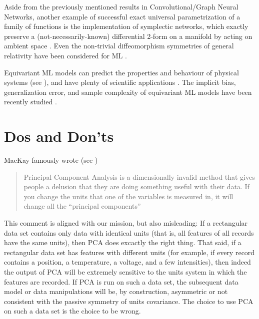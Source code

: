 \documentclass{article}
\theoremstyle{plain}
\theoremstyle{definition}
\theoremstyle{remark}
\begin{document}
Aside from the previously mentioned results in Convolutional/Graph Neural Networks, another example of successful exact universal parametrization of a family of functions is the implementation of symplectic networks, which exactly preserve a (not-necessarily-known) differential 2-form on a manifold by acting on ambient space \cite{sympnets,henonnets}. Even the non-trivial diffeomorphism symmetries of general relativity have been considered for ML \cite{weiler}.
 
Equivariant ML models can predict the properties and behaviour of physical systems (see \citealt{cheng2019covariance}), and have plenty of scientific applications \cite{batzner20223, musaelian2022learning, stark2022equibind, yu-physics, wang2022approximately}. The implicit bias, generalization error, and sample complexity of equivariant ML models have been recently studied \cite{lawrence2021implicit, bietti2021sample, elesedy2021provably, elesedy2021kernel, mei2021learning}.

\section{Dos and Don'ts}\label{sec:dos}

MacKay famously wrote (see \citealt{muldoonmedium})
\vspace{-1.5ex}\begin{quote}Principal Component Analysis is a dimensionally invalid method that gives people a delusion that they are doing something useful with their data. If you change the units that one of the variables is measured in, it will change all the ``principal components''\end{quote}\vspace{-1.5ex}
This comment is aligned with our mission, but also misleading: If a rectangular data set contains only data with identical units (that is, all features of all records have the same units), then PCA does excactly the right thing.
That said, if a rectangular data set has features with different units (for example, if every record contains a position, a temperature, a voltage, and a few intensities), then indeed the output of PCA will be extremely sensitive to the units system in which the features are recorded.
If PCA is run on such a data set, the subsequent data model or data manipulations will be, by construction, asymmetric or not consistent with the passive symmetry of units covariance.
The choice to use PCA on such a data set is the choice to be wrong.
\end{document}
